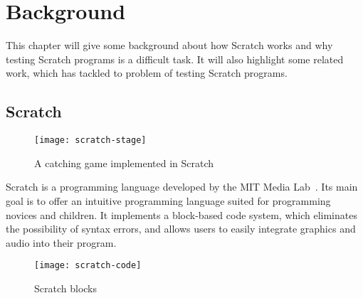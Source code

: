 
\chapter{Background}%
\label{cha:background}

This chapter will give some background about how Scratch works and why testing Scratch programs is a difficult task.
It will also highlight some related work, which has tackled to problem of testing Scratch programs.

\section{Scratch}%
\label{sec:scratch}


\begin{wrapfigure}{r}{0.35\textwidth + 5mm}
    \vspace{-3mm}
    \centering
    \texttt{[image: scratch-stage]}
    \caption{A catching game implemented in Scratch}
    \label{fig:a_catching_game_implemented_in_scratch}
    \vspace{-3mm}
\end{wrapfigure}

Scratch is a programming language developed by the MIT Media Lab~\cite{scratch}.
Its main goal is to offer an intuitive programming language suited for programming novices and children.
It implements a block-based code system, which eliminates the possibility of syntax errors,
and allows users to easily integrate graphics and audio into their program.

\begin{wrapfigure}{r}{0.45\textwidth + 5mm}
    \vspace{-3mm}
    \centering
    \texttt{[image: scratch-code]}
    \caption{Scratch blocks}
    \label{fig:scratch_blocks}
    \vspace{-3mm}
\end{wrapfigure}

